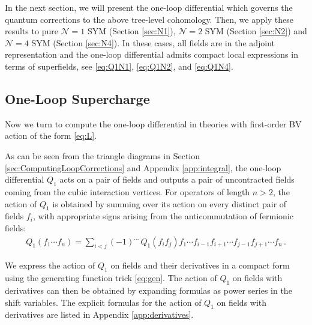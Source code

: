 \documentclass[11pt]{article}
\begin{document}
In the next section, we will present the one-loop differential which governs the quantum corrections to the above tree-level cohomology. Then, we apply these results to pure $\mathcal{N}=1$ SYM (Section \ref{sec:N1}), $\mathcal{N}=2$ SYM (Section \ref{sec:N2}) and $\mathcal{N}=4$ SYM (Section \ref{sec:N4}). In these cases, all fields are in the adjoint representation and the one-loop differential admits compact local expressions in terms of superfields, see \eqref{eq:Q1N1}, \eqref{eq:Q1N2}, and \eqref{eq:Q1N4}. 

\subsection{One-Loop Supercharge}
\label{sec:Q1computation}
Now we turn to compute the one-loop differential in theories with first-order BV action of the form \eqref{eq:L}. 

As can be seen from the triangle diagrams in Section \ref{sec:ComputingLoopCorrections} and Appendix \ref{app:integral}, the one-loop differential $Q_1$ acts on a pair of fields and outputs a pair of uncontracted fields coming from the cubic interaction vertices. For operators of length $n>2$, the action of $Q_1$ is obtained by summing over its action on every distinct pair of fields $f_i$, with appropriate signs arising from the anticommutation of fermionic fields:
\begin{align}
    Q_1 ( f_1 \cdots f_n ) = \sum_{i<j} (-1)^{\dots}\, Q_1(f_i f_j) f_1 \cdots f_{i-1} f_{i+1} \cdots f_{j-1} f_{j+1} \cdots f_n \, .
\end{align}

We express the action of $Q_1$ on fields and their derivatives in a compact form using the generating function trick \eqref{eq:gen}. The action of $Q_1$ on fields with derivatives can then be obtained by expanding formulas as power series in the shift variables. The explicit formulas for the action of $Q_1$ on fields with derivatives are listed in Appendix \ref{app:derivatives}.
\end{document}
